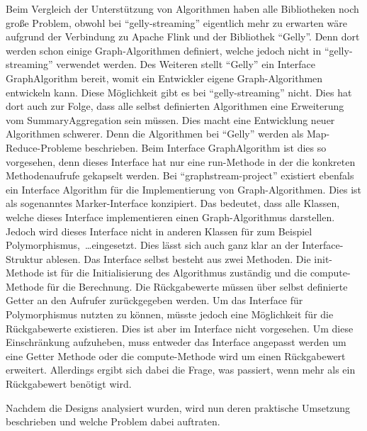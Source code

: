 Beim Vergleich der Unterstützung von Algorithmen haben alle Bibliotheken noch
große Problem, obwohl bei \enquote{gelly-streaming} eigentlich mehr zu erwarten
wäre aufgrund der Verbindung zu Apache Flink und der Bibliothek \enquote{Gelly}.
Denn dort werden schon einige Graph-Algorithmen definiert, welche jedoch nicht in
\enquote{gelly-streaming} verwendet werden. Des Weiteren stellt \enquote{Gelly}
ein Interface GraphAlgorithm bereit, womit ein Entwickler eigene Graph-Algorithmen
entwickeln kann. Diese Möglichkeit gibt es bei \enquote{gelly-streaming} nicht.
Dies hat dort auch zur Folge, dass alle selbst definierten Algorithmen eine
Erweiterung vom SummaryAggregation sein müssen. Dies macht eine Entwicklung
neuer Algorithmen schwerer. Denn die Algorithmen bei \enquote{Gelly} werden als
Map-Reduce-Probleme beschrieben. Beim Interface GraphAlgorithm ist dies so vorgesehen,
denn dieses Interface hat nur eine run-Methode in der die konkreten
Methodenaufrufe gekapselt werden. Bei \enquote{graphstream-project} existiert
ebenfals ein Interface Algorithm für die Implementierung von Graph-Algorithmen.
Dies ist als sogenanntes Marker-Interface konzipiert. Das bedeutet, dass alle
Klassen, welche dieses Interface implementieren einen Graph-Algorithmus darstellen.
Jedoch wird dieses Interface nicht in anderen Klassen für zum Beispiel
Polymorphismus,~\dots eingesetzt. Dies lässt sich auch ganz klar an der
Interface-Struktur ablesen. Das Interface selbst besteht aus zwei Methoden.
Die init-Methode ist für die Initialisierung des Algorithmus zuständig und die
compute-Methode für die Berechnung. Die Rückgabewerte müssen über selbst
definierte Getter an den Aufrufer zurückgegeben werden. Um das Interface für
Polymorphismus nutzten zu können, müsste jedoch eine Möglichkeit für die
Rückgabewerte existieren. Dies ist aber im Interface nicht vorgesehen. Um diese
Einschränkung aufzuheben, muss entweder das Interface angepasst werden um eine
Getter Methode oder die compute-Methode wird um einen Rückgabewert erweitert.
Allerdings ergibt sich dabei die Frage, was passiert, wenn mehr als ein
Rückgabewert benötigt wird.

Nachdem die Designs analysiert wurden, wird nun deren praktische Umsetzung
beschrieben und welche Problem dabei auftraten.
